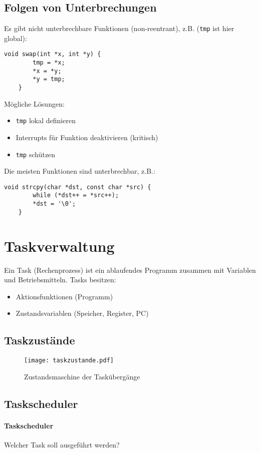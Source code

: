\subsection{Folgen von Unterbrechungen}
Es gibt nicht unterbrechbare Funktionen (\glqq{}non-reentrant\grqq{}), z.B. (\lstinline[style=c]{tmp} ist hier global):
\begin{lstlisting}[style=c]
    void swap(int *x, int *y) {
        tmp = *x;
        *x = *y;
        *y = tmp;
    }
\end{lstlisting}
Mögliche Lösungen:
\begin{itemize}
    \item \lstinline[style=c]{tmp} lokal definieren
    \item Interrupts für Funktion deaktivieren (kritisch)
    \item \lstinline[style=c]{tmp} schützen
\end{itemize}

Die meisten Funktionen sind unterbrechbar, z.B.:
\begin{lstlisting}[style=c]
    void strcpy(char *dst, const char *src) {
        while (*dst++ = *src++);
        *dst = '\0';
    }
\end{lstlisting}

\section{Taskverwaltung}
Ein Task (\glqq{}Rechenprozess\grqq{}) ist ein ablaufendes Programm zusammen mit Variablen und Betriebsmitteln.
Tasks besitzen:
\begin{itemize}
    \item Aktionsfunktionen (\glqq{}Programm\grqq{})
    \item Zustandsvariablen (Speicher, Register, PC)
\end{itemize}
\subsection{Taskzustände}
\begin{figure}[H]
    \centering
    \texttt{[image: taskzustande.pdf]}
    \caption{Zustandsmaschine der Taskübergänge}
\end{figure}

\subsection{Taskscheduler}
\paragraph{Taskscheduler} Welcher Task soll ausgeführt werden?

